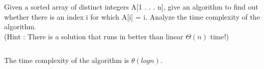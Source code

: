 \begin{prob}
   Given a sorted array of distinct integers A[1 . . . n], give an algorithm to find out whether there is an index i for which A[i] = i. Analyze the time complexity of the algorithm. 
   \\
   (Hint : There is a solution that runs in better than linear $\Theta(n)$ time!)
    \begin{soln}
        \inputminted{python}{\thisdir/include/soln.py}
        The time complexity of the algorithm is $\theta(log n)$.
    \end{soln}  
\end{prob}
